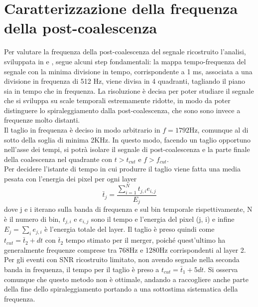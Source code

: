 \section{Caratterizzazione della frequenza della post-coalescenza}
\label{section:Frequenza_PM}
Per valutare la frequenza della post-coalescenza del segnale ricostruito l'analisi, sviluppata in \cite{Puecher_2018} e \cite{Tringali_2017}, segue alcuni step fondamentali:
la mappa tempo-frequenza del segnale con la minima divisione in tempo, corrispondente a 1 ms, associata a una divisione in frequenza di 512 Hz, viene divisa in 4 quadranti, tagliando il piano sia in tempo che in frequenza. La risoluzione è decisa per poter studiare il segnale che si sviluppa su scale temporali estremamente ridotte, in modo da poter distinguere lo spiraleggiamento dalla post-coalescenza, che sono sono invece a frequenze molto distanti.\\
Il taglio in frequenza è deciso in modo arbitrario in $f = 1792$Hz, comunque al di sotto della soglia di minima 2KHz. In questo modo, facendo un taglio opportuno nell'asse dei tempi, si potrà isolare il segnale di post-coalescenza e la parte finale della coalescenza nel quadrante con $t>t_{cut}$ e $f>f_{cut}$. \\ 
Per decidere l'istante di tempo in cui produrre il taglio viene fatta una media pesata con l'energia dei pixel per ogni layer
\begin{equation}
\bar{t}_j = \frac{\sum_{i=1}^Nt_{j,i}e_{i,j}}{E_{j}}
\end{equation}
dove j e i iterano sulla banda di frequenza e sul bin temporale rispettivamente, N è il numero di bin, $t_{j,i}$ e $e_{i,j}$ sono il tempo e l'energia del pixel (j, i) e infine $E_{j} = \sum_{i}e_{j,i}$ è l'energia totale del layer. Il taglio è preso quindi come $t_{cut} = \bar{t}_2 + dt$ con $\bar{t}_2$ tempo stimato per il merger, poiché quest'ultimo ha generalmente frequenze comprese tra 768Hz e 1280Hz corrispondenti al layer 2. Per gli eventi con SNR ricostruito limitato, non avendo segnale nella seconda banda in frequenza, il tempo per il taglio è preso a $t_{cut} = \bar{t}_1 + 5dt$. Si osserva comunque che questo metodo non è ottimale, andando a raccogliere anche parte della fine dello spiraleggiamento portando a una sottostima sistematica della frequenza.\\
